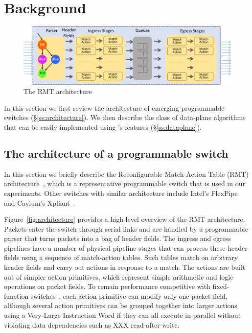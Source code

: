 \section{Background}
\label{s:context}

\begin{figure}
\includegraphics[width=\textwidth]{p4_switch_model.png}
\caption{The RMT architecture}
\end{figure}

In this section we first review the architecture of
emerging programmable switches (\S\ref{ss:architecture}). We then describe the
class of data-plane algorithms that can be easily implemented using 
\pktlanguage's features (\S\ref{ss:dataplane}). 



\subsection{The architecture of a programmable switch}
\label{s:architecture}
In this section we briefly describe the Reconfigurable Match-Action Table (RMT)
architecture~\cite{rmt}, which is a representative programmable switch 
that is used in our experiments. Other switches with similar architecture include
Intel's FlexPipe~\cite{flexpipe} and Cavium's Xpliant~\cite{xpliant}.

Figure~\ref{fig:architecture} provides a
high-level overview of the RMT architecture. Packets enter the switch through
serial links and are handled by a programmable parser that turns packets into a
bag of header fields. The ingress and egress pipelines have a number of
physical pipeline stages that can process these header fields using a sequence
of match-action tables.
Such tables match on arbitrary header fields and carry out actions in response
to a match.  The actions are built out of simpler action primitives, which
represent simple arithmetic and logic operations on packet fields. To remain
performance competitive with fixed-function switches~\cite{mellanox, broadcom},
each action primitive can modify only one packet field, although several action
primitives can be grouped together into larger actions using a Very-Large
Instruction Word if they can all execute in parallel without violating data
dependencies such as XXX read-after-write.

